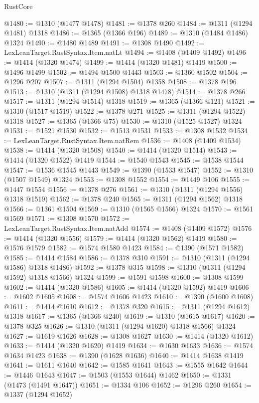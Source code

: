 \begin{lexlean}{RustCore}
\begin{coremodule}
@1480 := @1310 (@1477 @1478)
@1481 := @1378 @260
@1484 := @1311 (@1294 @1481) @1318
@1486 := @1365 (@1366 @196)
@1489 := @1310 (@1484 @1486) @1324
@1490 := @1480 @1489
@1491 := @1308 @1490
@1492 := LexLeanTarget.RustSyntax.Item.natLt
@1494 := @1408 (@1409 @1492)
@1496 := @1414 (@1320 @1474)
@1499 := @1414 (@1320 @1481) @1419
@1500 := @1496 @1499
@1502 := @1494 @1500 @1443
@1503 := @1360 @1502
@1504 := @1296 @207
@1507 := @1311 (@1294 @1504) @1358
@1508 := @1378 @196
@1513 := @1310 (@1311 (@1294 @1508) @1318 @1478)
@1514 := @1378 @266
@1517 := @1311 (@1294 @1514) @1318
@1519 := @1365 (@1366 @121)
@1521 := @1310 (@1517 @1519)
@1522 := @1378 @271
@1525 := @1311 (@1294 @1522) @1318
@1527 := @1365 (@1366 @75)
@1530 := @1310 (@1525 @1527) @1324
@1531 := @1521 @1530
@1532 := @1513 @1531
@1533 := @1308 @1532
@1534 := LexLeanTarget.RustSyntax.Item.natRem
@1536 := @1408 (@1409 @1534)
@1538 := @1414 (@1320 @1508)
@1540 := @1414 (@1320 @1514)
@1543 := @1414 (@1320 @1522) @1419
@1544 := @1540 @1543
@1545 := @1538 @1544
@1547 := @1536 @1545 @1443
@1549 := @1390 (@1533 @1547)
@1552 := @1310 (@1507 @1549) @1324
@1553 := @1308 @1552
@1554 := @1449 @106
@1555 := @1447 @1554
@1556 := @1378 @276
@1561 := @1310 (@1311 (@1294 @1556) @1318 @1519)
@1562 := @1378 @240
@1565 := @1311 (@1294 @1562) @1318
@1566 := @1361 @1504
@1569 := @1310 (@1565 @1566) @1324
@1570 := @1561 @1569
@1571 := @1308 @1570
@1572 := LexLeanTarget.RustSyntax.Item.natAdd
@1574 := @1408 (@1409 @1572)
@1576 := @1414 (@1320 @1556)
@1579 := @1414 (@1320 @1562) @1419
@1580 := @1576 @1579
@1582 := @1574 @1580 @1423
@1584 := @1390 (@1571 @1582)
@1585 := @1414 @1584
@1586 := @1378 @310
@1591 := @1310 (@1311 (@1294 @1586) @1318 @1486)
@1592 := @1378 @315
@1598 := @1310 (@1311 (@1294 @1592) @1318 @1566) @1324
@1599 := @1591 @1598
@1600 := @1308 @1599
@1602 := @1414 (@1320 @1586)
@1605 := @1414 (@1320 @1592) @1419
@1606 := @1602 @1605
@1608 := @1574 @1606 @1423
@1610 := @1390 (@1600 @1608)
@1611 := @1414 @1610
@1612 := @1378 @320
@1615 := @1311 (@1294 @1612) @1318
@1617 := @1365 (@1366 @240)
@1619 := @1310 (@1615 @1617)
@1620 := @1378 @325
@1626 := @1310 (@1311 (@1294 @1620) @1318 @1566) @1324
@1627 := @1619 @1626
@1628 := @1308 @1627
@1630 := @1414 (@1320 @1612)
@1633 := @1414 (@1320 @1620) @1419
@1634 := @1630 @1633
@1636 := @1574 @1634 @1423
@1638 := @1390 (@1628 @1636)
@1640 := @1414 @1638 @1419
@1641 := @1611 @1640
@1642 := @1585 @1641
@1643 := @1555 @1642
@1644 := @1446 @1643
@1647 := @1503 (@1553 @1644) @1462
@1650 := @1331 (@1473 (@1491 @1647))
@1651 := @1334 @106
@1652 := @1296 @260
@1654 := @1337 (@1294 @1652)

\end{coremodule}
\end{lexlean}
